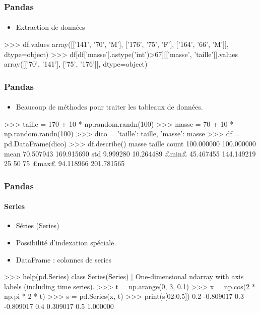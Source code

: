 \begin{frame}[fragile]
\frametitle{Pandas}
\framesubtitle{}
\begin{itemize}
 \item Extraction de données
\end{itemize}

\begin{pythonConsole}
>>> df.values
array([['141', '70', 'M'],
       ['176', '75', 'F'],
       ['164', '66', 'M']], dtype=object)
>>> df[df['masse'].astype('int')>67][['masse', 'taille']].values
array([['70', '141'],
       ['75', '176']], dtype=object)
\end{pythonConsole}
\end{frame}
\begin{frame}[fragile]
\frametitle{Pandas}
\framesubtitle{}
\begin{itemize}
 \item Beaucoup de méthodes pour traiter les tableaux de données. 
\end{itemize}

\begin{pythonConsole}
>>> taille = 170 + 10 * np.random.randn(100)
>>> masse = 70 + 10 * np.random.randn(100)
>>> dico = {'taille': taille, 'masse': masse}
>>> df = pd.DataFrame(dico)
>>> df.describe()
            masse      taille
count  100.000000  100.000000
mean    70.507943  169.915690
std      9.999280   10.264489
£min£     45.467455  144.149219
25%
50%
75%
£max£     94.118966  201.781565
\end{pythonConsole}
\end{frame}
\begin{frame}[fragile]
\frametitle{Pandas}
\framesubtitle{Series}
\begin{itemize}
 \item Séries (Series)
 \item Possibilité d'indexation spéciale.
 \item DataFrame : colonnes de series
\end{itemize}

\begin{pythonConsole}
>>> help(pd.Series)
class Series(Series)
 |  One-dimensional ndarray with axis labels (including time series).
>>> t = np.arange(0, 3, 0.1)
>>> x = np.cos(2 * np.pi * 2 * t)
>>> s = pd.Series(x, t)
>>> print(s[02:0.5])
0.2   -0.809017
0.3   -0.809017
0.4    0.309017
0.5    1.000000
\end{pythonConsole}
\end{frame}
